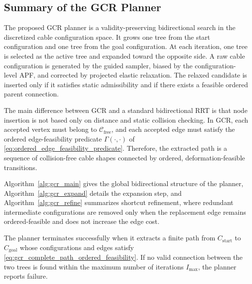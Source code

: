 \documentclass{pas}
\begin{document}
\subsection{Summary of the GCR Planner} 
\label{subsec:gcr_summary} 
The proposed GCR planner is a validity-preserving bidirectional search in the discretized cable configuration space. It grows one tree from the start configuration and one tree from the goal configuration. At each iteration, one tree is selected as the active tree and expanded toward the opposite side. A raw cable configuration is generated by the guided sampler, biased by the configuration-level APF, and corrected by projected elastic relaxation. The relaxed candidate is inserted only if it satisfies static admissibility and if there exists a feasible ordered parent connection.

The main difference between GCR and a standard bidirectional RRT is that node insertion is not based only on distance and static collision checking. In GCR, each accepted vertex must belong to \(\mathcal{C}_{\mathrm{free}}\), and each accepted edge must satisfy the ordered edge-feasibility predicate \(\Gamma(\cdot,\cdot)\) of \eqref{eq:ordered_edge_feasibility_predicate}. Therefore, the extracted path is a sequence of collision-free cable shapes connected by ordered, deformation-feasible transitions.

Algorithm~\ref{alg:gcr_main} gives the global bidirectional structure of the planner, Algorithm~\ref{alg:gcr_expand} details the expansion step, and Algorithm~\ref{alg:gcr_refine} summarizes shortcut refinement, where redundant intermediate configurations are removed only when the replacement edge remains ordered-feasible and does not increase the edge cost.

The planner terminates successfully when it extracts a finite path from \(C_{\mathrm{start}}\) to \(C_{\mathrm{goal}}\) whose configurations and edges satisfy \eqref{eq:gcr_complete_path_ordered_feasibility}. If no valid connection between the two trees is found within the maximum number of iterations \(I_{\max}\), the planner reports failure.
\end{document}
